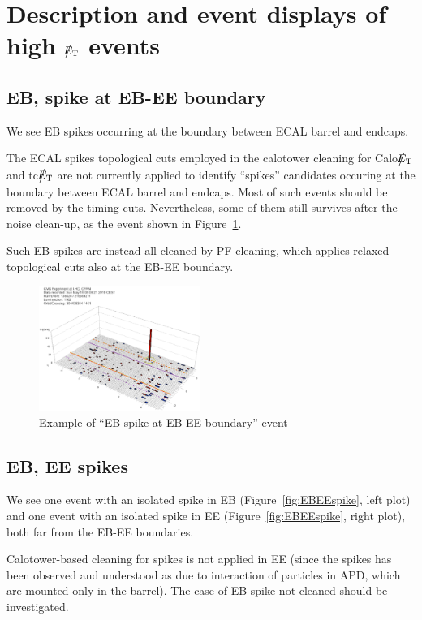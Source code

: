 \section{Description and event displays of high $\big\slash\hspace{-1.6ex}{E_\text{T}}$ events}

\subsection{EB, spike at EB-EE boundary}
We see EB spikes occurring at the boundary between ECAL barrel and endcaps.

The ECAL spikes topological cuts employed in the calotower cleaning for Calo$\big\slash\hspace{-1.6ex}{E_\text{T}}$ and tc$\big\slash\hspace{-1.6ex}{E_\text{T}}$ 
are not currently applied to identify ``spikes'' candidates occuring at the boundary between ECAL barrel and endcaps. 
Most of such events should be removed by the timing cuts. Nevertheless, some of them still survives 
after the noise clean-up, as the event shown in Figure~\ref{fig:EBspikeAtBorder}.

Such EB spikes are instead all cleaned by PF cleaning, which applies relaxed topological cuts also at the EB-EE boundary.
%
\begin{figure}[h]
 \centering
   \includegraphics[width=0.47\textwidth]{fig/EBspikeAtBorder.eps} 
\caption{Example of ``EB spike at EB-EE boundary'' event}
\label{fig:EBspikeAtBorder}
\end{figure}

\subsection{EB, EE spikes}
We see one event with an isolated spike in EB (Figure~\ref{fig:EBEEspike}, left plot) 
and one event with an isolated spike in EE (Figure~\ref{fig:EBEEspike}, right plot), both far from the EB-EE boundaries.

Calotower-based cleaning for spikes is not applied in EE (since the spikes has been observed and understood 
as due to interaction of particles in APD, which are mounted only in the barrel). 
The case of EB spike not cleaned should be investigated.


